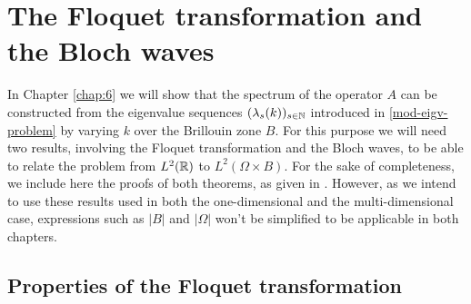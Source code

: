 \chapter{The Floquet transformation and the Bloch waves} \label{chap:5}

In Chapter \ref{chap:6} we will show that the spectrum of the operator $A$ can be constructed from the eigenvalue sequences $(\lambda_{s}(k))_{s \in \mathbb{N}}$ introduced in \eqref{mod-eigv-problem} by varying $k$ over the Brillouin zone $B$. For this purpose we will need two results, involving the Floquet transformation and the Bloch waves, to be able to relate the problem from $L^{2}(\mathbb{R})$ to $L^{2}(\Omega \times B)$. For the sake of completeness, we include here the proofs of both theorems, as given in \cite[Section 3.4, 3.5]{dorfler2011photonic}. However, as we intend to use these results used in both the one-dimensional and the multi-dimensional case, expressions such as $|B|$ and $|\Omega|$ won't be simplified to be applicable in both chapters. 

\section{Properties of the Floquet transformation} \label{sec:5.1}

